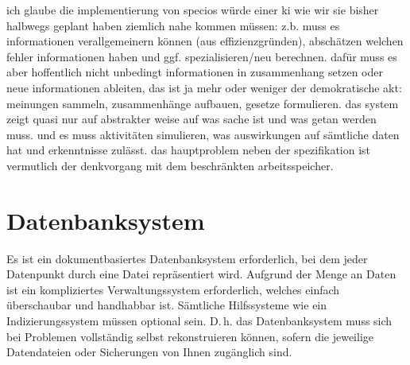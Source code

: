 ich glaube die implementierung von specios würde einer ki wie wir sie bisher halbwegs geplant haben ziemlich nahe kommen müssen:
z.b. muss es informationen verallgemeinern können (aus effizienzgründen), abschätzen welchen fehler informationen haben und ggf. spezialisieren/neu berechnen. dafür muss es aber hoffentlich nicht unbedingt informationen in zusammenhang setzen oder neue informationen ableiten, das ist ja mehr oder weniger der demokratische akt: meinungen sammeln, zusammenhänge aufbauen, gesetze formulieren. das system zeigt quasi nur auf abstrakter weise auf was sache ist und was getan werden muss.
und es muss aktivitäten simulieren, was auswirkungen auf sämtliche daten hat und erkenntnisse zulässt.
das hauptproblem neben der spezifikation ist vermutlich der denkvorgang mit dem beschränkten arbeitsspeicher.

\section{Datenbanksystem}\label{sec:database}

Es ist ein dokumentbasiertes Datenbanksystem erforderlich, bei dem jeder Datenpunkt durch eine Datei repräsentiert wird. Aufgrund der Menge an Daten ist ein kompliziertes Verwaltungssystem erforderlich, welches einfach überschaubar und handhabbar ist. Sämtliche Hilfssysteme wie ein Indizierungssystem müssen optional sein. D.\,h. das Datenbanksystem muss sich bei Problemen vollständig selbst rekonstruieren können, sofern die jeweilige Datendateien oder Sicherungen von Ihnen zugänglich sind.
